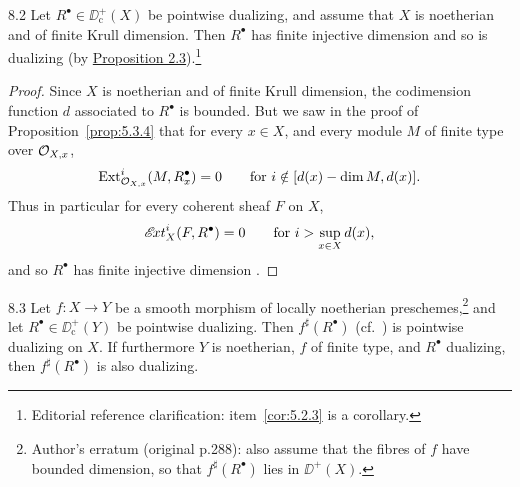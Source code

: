 \begin{bookproposition}{8.2}\label{prop:5.8.2}
Let $R^\bullet\in\DD_{\mathrm{c}}^{+}(X)$ be pointwise dualizing, and assume that $X$ is noetherian and of finite Krull dimension. Then $R^\bullet$ has finite injective dimension and so is dualizing (by \hyperref[cor:5.2.3]{Proposition 2.3}).\footnote{Editorial reference clarification: item~\ref{cor:5.2.3} is a corollary.}
\end{bookproposition}

\begin{proof}
Since $X$ is noetherian and of finite Krull dimension, the codimension function $d$ associated to $R^\bullet$ is bounded. But we saw in the proof of Proposition~\ref{prop:5.3.4} that for every $x\in X$, and every module $M$ of finite type over $\mathcal{O}_{X,x}$,
\[
\operatorname{Ext}_{\mathcal{O}_{X,x}}^{i}(M, R_{x}^{\bullet}) = 0 \qquad\text{for } i\notin[d(x)-\dim M, d(x)].
\]
Thus in particular for every coherent sheaf $F$ on $X$,
\[
\mathop{\mathscr{E}\!xt}\nolimits_{X}^{i}(F,R^{\bullet}) = 0 \qquad\text{for } i > \sup_{x\in X} d(x),
\]
and so $R^\bullet$ has finite injective dimension .
\end{proof}

\begin{booktheorem}{8.3}\label{thm:5.8.3}
Let $f\colon X\to Y$ be a smooth morphism of locally noetherian preschemes,\footnote{Author's erratum (original p.288): also assume that the fibres of $f$ have bounded dimension, so that $f^\sharp(R^\bullet)$ lies in $\DD^+(X)$.} and let $R^{\bullet}\in\DD^{+}_{\mathrm{c}}(Y)$ be pointwise dualizing. Then $f^{\sharp}(R^{\bullet})$ (cf.\ ) is pointwise dualizing on $X$. If furthermore $Y$ is noetherian, $f$ of finite type, and $R^{\bullet}$ dualizing, then $f^{\sharp}(R^{\bullet})$ is also dualizing.
\end{booktheorem}

